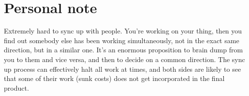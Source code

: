 \documentclass{tufte-handout}
\begin{document}
\section{Personal note}

Extremely hard to sync up with people. You're working on your thing,
then you find out somebody else has been working simultaneously, not
in the exact same direction, but in a similar one. It's an enormous
proposition to brain dump from you to them and vice versa, and then to
decide on a common direction. The sync up process can effectively halt
all work at times, and both sides are likely to see that some of their
work (sunk costs) does not get incorporated in the final product.
\end{document}
